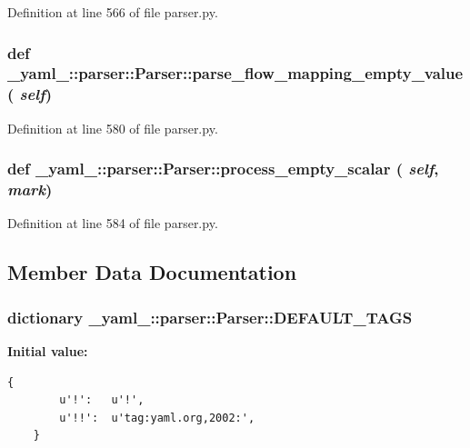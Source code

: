 Definition at line 566 of file parser.py.
\subsubsection{\setlength{\rightskip}{0pt plus 5cm}def \_\-yaml\_\-::parser::Parser::parse\_\-flow\_\-mapping\_\-empty\_\-value ( {\em self})}\label{class__yaml___1_1parser_1_1Parser_6290845ab46bb16251ff2b54f6719201}




Definition at line 580 of file parser.py.
\subsubsection{\setlength{\rightskip}{0pt plus 5cm}def \_\-yaml\_\-::parser::Parser::process\_\-empty\_\-scalar ( {\em self},  {\em mark})}\label{class__yaml___1_1parser_1_1Parser_dd0c73fff91d16fbb1ac7ed6818c63b7}




Definition at line 584 of file parser.py.

\subsection{Member Data Documentation}
\subsubsection{\setlength{\rightskip}{0pt plus 5cm}dictionary {\bf \_\-yaml\_\-::parser::Parser::DEFAULT\_\-TAGS}\hspace{0.3cm}{\tt  [static]}}\label{class__yaml___1_1parser_1_1Parser_df6b1d18a1781ce45d16c531a538f744}


\textbf{Initial value:}

\begin{Code}\begin{verbatim}{
        u'!':   u'!',
        u'!!':  u'tag:yaml.org,2002:',
    }
\end{verbatim}
\end{Code}


